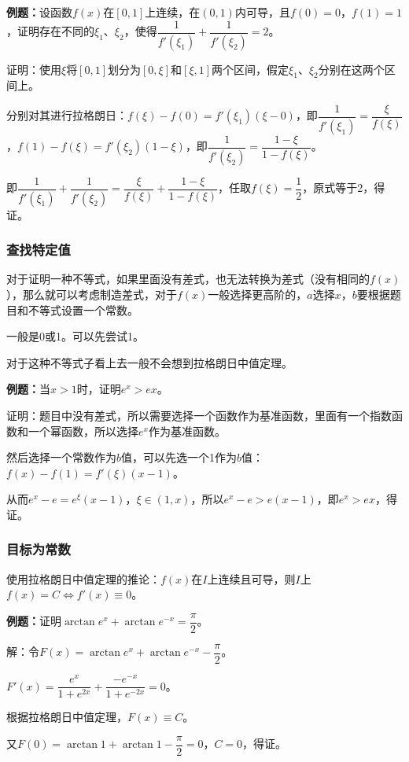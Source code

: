 \textbf{例题：}设函数$f(x)$在$[0,1]$上连续，在$(0,1)$内可导，且$f(0)=0$，$f(1)=1$，证明存在不同的$\xi_1$、$\xi_2$，使得$\dfrac{1}{f'(\xi_1)}+\dfrac{1}{f'(\xi_2)}=2$。

证明：使用$\xi$将$[0,1]$划分为$[0,\xi]$和$[\xi,1]$两个区间，假定$\xi_1$、$\xi_2$分别在这两个区间上。

分别对其进行拉格朗日：$f(\xi)-f(0)=f'(\xi_1)(\xi-0)$，即$\dfrac{1}{f'(\xi_1)}=\dfrac{\xi}{f(\xi)}$，$f(1)-f(\xi)=f'(\xi_2)(1-\xi)$，即$\dfrac{1}{f'(\xi_2)}=\dfrac{1-\xi}{1-f(\xi)}$。

即$\dfrac{1}{f'(\xi_1)}+\dfrac{1}{f'(\xi_2)}=\dfrac{\xi}{f(\xi)}+\dfrac{1-\xi}{1-f(\xi)}$，任取$f(\xi)=\dfrac{1}{2}$，原式等于2，得证。

\subsubsection{查找特定值}

对于证明一种不等式，如果里面没有差式，也无法转换为差式（没有相同的$f(x)$），那么就可以考虑制造差式，对于$f(x)$一般选择更高阶的，$a$选择$x$，$b$要根据题目和不等式设置一个常数。

一般是0或1。可以先尝试1。

对于这种不等式子看上去一般不会想到拉格朗日中值定理。

\textbf{例题：}当$x>1$时，证明$e^x>ex$。

证明：题目中没有差式，所以需要选择一个函数作为基准函数，里面有一个指数函数和一个幂函数，所以选择$e^x$作为基准函数。

然后选择一个常数作为$b$值，可以先选一个1作为$b$值：$f(x)-f(1)=f'(\xi)(x-1)$。

从而$e^x-e=e^\xi(x-1)$，$\xi\in(1,x)$，所以$e^x-e>e(x-1)$，即$e^x>ex$，得证。

\subsubsection{目标为常数}

使用拉格朗日中值定理的推论：$f(x)$在$I$上连续且可导，则$I$上$f(x)=C\Leftrightarrow f'(x)\equiv 0$。

\textbf{例题：}证明$\arctan e^x+\arctan e^{-x}=\dfrac{\pi}{2}$。

解：令$F(x)=\arctan e^x+\arctan e^{-x}-\dfrac{\pi}{2}$。

$F'(x)=\dfrac{e^x}{1+e^{2x}}+\dfrac{-e^{-x}}{1+e^{-2x}}=0$。

根据拉格朗日中值定理，$F(x)\equiv C$。

又$F(0)=\arctan 1+\arctan 1-\dfrac{\pi}{2}=0$，$C=0$，得证。

